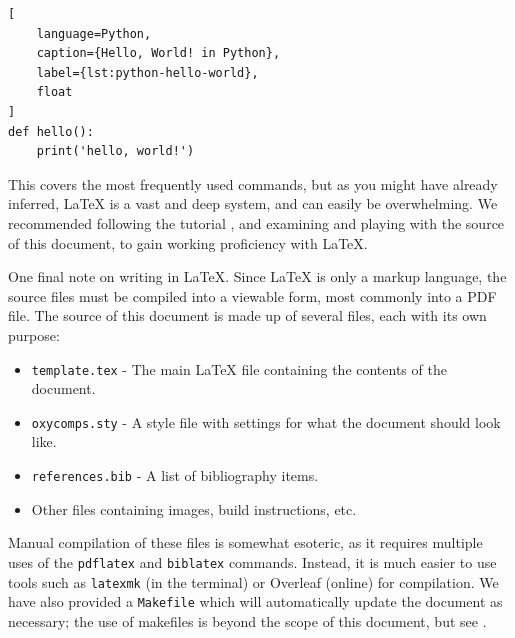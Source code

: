 \documentclass[10pt,twocolumn]{article}
\begin{document}
\begin{lstlisting}[
    language=Python,
    caption={Hello, World! in Python},
    label={lst:python-hello-world},
    float
]
def hello():
    print('hello, world!')
\end{lstlisting}

This covers the most frequently used commands, but as you might have already inferred, LaTeX is a vast and deep system, and can easily be overwhelming.
We recommended following the  tutorial \cite{Overleaf2021LearnLaTeXIn}, and examining and playing with the source of this document, to gain working proficiency with LaTeX.

One final note on writing in LaTeX.
Since LaTeX is only a markup language, the source files must be compiled into a viewable form, most commonly into a PDF file.
The source of this document is made up of several files, each with its own purpose:
\begin{itemize}
    \item \texttt{template.tex} - The main LaTeX file containing the contents of the document.
    \item \texttt{oxycomps.sty} - A style file with settings for what the document should look like.
    \item \texttt{references.bib} - A list of bibliography items.
    \item Other files containing images, build instructions, etc.
\end{itemize}
Manual compilation of these files is somewhat esoteric, as it requires multiple uses of the \texttt{pdflatex} and \texttt{biblatex} commands.
Instead, it is much easier to use tools such as \texttt{latexmk} (in the terminal) or Overleaf (online) for compilation.
We have also provided a \texttt{Makefile} which will automatically update the document as necessary; the use of makefiles is beyond the scope of this document, but see \textcite{Lambert2021MakefileTutorial}.

\end{document}
